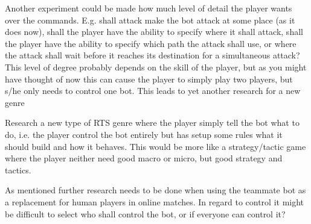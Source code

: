 Another experiment could be made how much level of detail the player wants over the commands. E.g. shall attack make the bot attack at some place (as it does now), shall the player have the ability to specify where it shall attack, shall the player have the ability to specify which path the attack shall use, or where the attack shall wait before it reaches its destination for a simultaneous attack? This level of degree probably depends on the skill of the player, but as you might have thought of now this can cause the player to simply play two players, but s/he only needs to control one bot. This leads to yet another research for a new genre

Research a new type of RTS genre where the player simply tell the bot what to do, i.e. the player control the bot entirely but has setup some rules what it should build and how it behaves. This would be more like a strategy/tactic game where the player neither need good macro or micro, but good strategy and tactics.

As mentioned further research needs to be done when using the teammate bot as a replacement for human players in online matches. In regard to control it might be difficult to select who shall control the bot, or if everyone can control it?